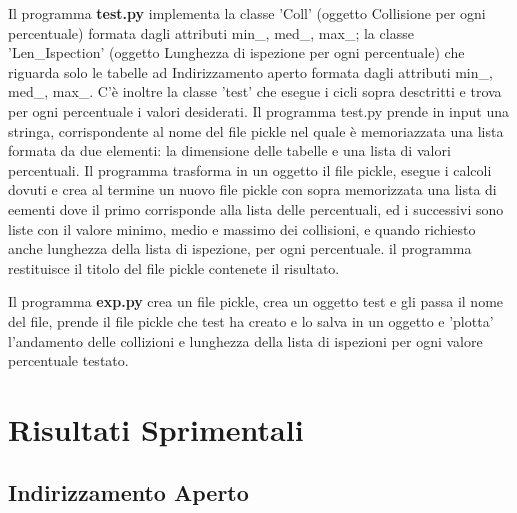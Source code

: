 \documentclass{article}
\begin{document}
Il programma \textbf{test.py} implementa la classe 'Coll' (oggetto Collisione per ogni percentuale) formata dagli attributi min\_, med\_, max\_; la classe 'Len\_Ispection' (oggetto Lunghezza di ispezione per ogni percentuale) che riguarda solo le tabelle ad Indirizzamento aperto formata dagli attributi min\_, med\_, max\_. C'è inoltre la classe 'test' che esegue i cicli sopra desctritti e trova per ogni percentuale i valori desiderati.
Il programma test.py prende in input una stringa, corrispondente al nome del file pickle nel quale è memoriazzata una lista formata da due elementi: la dimensione delle tabelle e una lista di valori percentuali. Il programma trasforma in un oggetto il file pickle, esegue i calcoli dovuti e crea al termine un nuovo file pickle con sopra memorizzata una lista di eementi dove il primo corrisponde alla lista delle percentuali, ed i successivi sono liste con il valore minimo, medio e massimo dei collisioni, e quando richiesto anche lunghezza della lista di ispezione, per ogni percentuale. il programma restituisce il titolo del file pickle contenete il risultato.

Il programma \textbf{exp.py} crea un file pickle, crea un oggetto test e gli passa il nome del file, prende il file pickle che test ha creato e lo salva in un oggetto e 'plotta' l'andamento delle collizioni e lunghezza della lista di ispezioni per ogni valore percentuale testato. 

\newpage
\section{Risultati Sprimentali}
\subsection{Indirizzamento Aperto}
\end{document}
